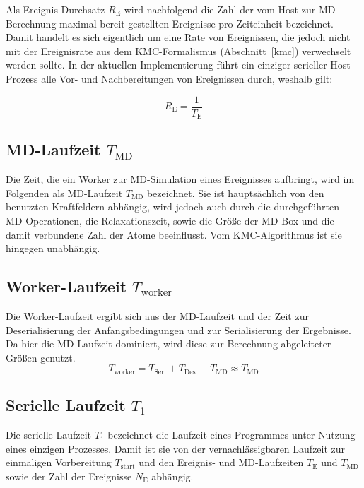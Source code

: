 Als Ereignis-Durchsatz $R_\text{E}$ wird nachfolgend die Zahl der vom Host zur MD-Berechnung maximal bereit gestellten Ereignisse pro Zeiteinheit bezeichnet.
Damit handelt es sich eigentlich um eine Rate von Ereignissen, die jedoch nicht mit der Ereignisrate aus dem KMC-Formalismus (Abschnitt~\ref{kmc}) verwechselt werden sollte.
In der aktuellen Implementierung führt ein einziger serieller Host-Prozess alle Vor- und Nachbereitungen von Ereignissen durch, weshalb gilt:

\begin{equation}
  R_\text{E} = \frac{1}{T_\text{E}}
\end{equation}

\subsection{MD-Laufzeit \texorpdfstring{$T_\text{MD}$}{TMD}}

Die Zeit, die ein Worker zur MD-Simulation eines Ereignisses aufbringt, wird im Folgenden als MD-Laufzeit $T_\text{MD}$ bezeichnet.
Sie ist hauptsächlich von den benutzten Kraftfeldern abhängig, wird jedoch auch durch die durchgeführten MD-Operationen, die Relaxationszeit, sowie die Größe der MD-Box und die damit verbundene Zahl der Atome beeinflusst.
Vom KMC-Algorithmus ist sie hingegen unabhängig.

\subsection{Worker-Laufzeit \texorpdfstring{$T_\text{worker}$}{Tworker}}

Die Worker-Laufzeit ergibt sich aus der MD-Laufzeit und der Zeit zur Deserialisierung der Anfangsbedingungen und zur Serialisierung der Ergebnisse.
Da hier die MD-Laufzeit dominiert, wird diese zur Berechnung abgeleiteter Größen genutzt.
\begin{equation}
  T_\text{worker} = T_\text{Ser.} + T_\text{Des.} + T_\text{MD} \approx T_\text{MD}
\end{equation}

\subsection{Serielle Laufzeit \texorpdfstring{$T_1$}{T1}}

Die serielle Laufzeit $T_1$ bezeichnet die Laufzeit eines Programmes unter Nutzung eines einzigen Prozesses.
Damit ist sie von der vernachlässigbaren Laufzeit zur einmaligen Vorbereitung $T_\text{start}$ und den Ereignis- und MD-Laufzeiten $T_\text{E}$ und $T_\text{MD}$ sowie der Zahl der Ereignisse $N_\text{E}$ abhängig.

